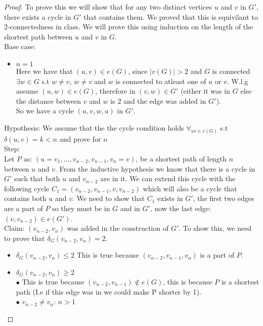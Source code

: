 \documentclass[12pt]{article}
\begin{document}
\begin{proof}
  To prove this we will show that for any two distinct vertices $u$ and $v$ in
  $G'$, there exists a cycle in $G'$ that contains them. We proved that this is
  equivilant to 2-connectedness in class.
  We will prove this using induction on the length of the shortest path between
  $u$ and $v$ in $G$. \\
	Base case:
	\begin{itemize}
		\item{$n=1$} \\
			Here we have that $(u, v) \in e(G)$, since $|v(G)| > 2$ and $G$ is
      connected $\exists w \in G$ s.t $w \neq v$,  $w \neq v$ and $w$ is
      connected to atleast one of $u$ or $v$. W.l.g assume $(u, w) \in e(G)$,
      therefore in $(v, w) \in G'$ (either it was in $G$ else the distance
      between $v$ and $w$ is 2 and the edge was added in $G'$).\\
      So we have a cycle $(u, v, w, u)$ in $G'$.
	\end{itemize}
	Hypothesis: We assume that the the cycle condition holds 
  $\forall_{u v \in v(G)}$ s.t $\delta(u,v) = k < n$ and prove for
  $n$ \\
	Step: \\
	Let $P$ as: $(u = v_1, \ldots, v_{n-2} ,v_{n-1},v_n = v)$, be a shortest path
  of length $n$ between $u$ and $v$.
  From the inductive hypothesis we know that there is a cycle in $G'$ such that
  both $u$ and $v_{n-2}$ are in it. We can extend this cycle with the following
  cycle $C_1 = (v_{n-2}, v_{n-1}, v, v_{n-2})$ which will also be a cycle that
  contains both $u$ and $v$. We need to show that $C_1$ exists in $G'$, the
  first two edges are a part of $P$ so they must be in $G$ and in $G'$, now the
  last edge: $(v, v_{n-2}) \in e(G')$.\\
  Claim: $(v_{n-2}, v_n)$ was
      added in the construction of $G'$. To show this, we need to prove that
      $\delta_{G}(v_{n-2}, v_n)= 2$. 
			\begin{itemize}
        \item $\delta_{G}(v_{n-2}, v_n) \le 2$ This is true because $(v_{n-2},
          v_{n-1}, v_{n})$ is a part of $P$.
				\item $\delta_{G}(v_{n-2}, v_n) \ge 2$ \\
        $\bullet$ This is true because $(v_{n-2}, v_{n-1}) \not\in e(G)$, this
          is because $P$ is
          a shortest path (I.e if this edge was in we could make P shorter by
          1).\\
				$\bullet$ $v_{n-2} \neq v_n$: $n > 1$
			\end{itemize} 
\end{proof}
\end{document}
